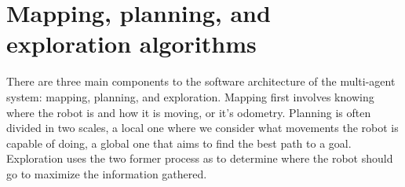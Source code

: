\documentclass[11pt]{article}
\begin{document}
        \begin{table}[]
            \centering
            \mbox{}
            \label{tab:patched_instructions}    
            \caption{Patched instructions for version check}
        \end{table}




    \newpage

\section{Mapping, planning, and exploration algorithms}

    There are three main components to the software architecture of the multi-agent system: mapping, planning, and exploration. Mapping first involves knowing where the robot is and how it is moving, or it's odometry. Planning is often divided in two scales, a local one where we consider what movements the robot is capable of doing, a global one that aims to find the best path to a goal. Exploration uses the two former process as to determine where the robot should go to maximize the information gathered.
\end{document}
